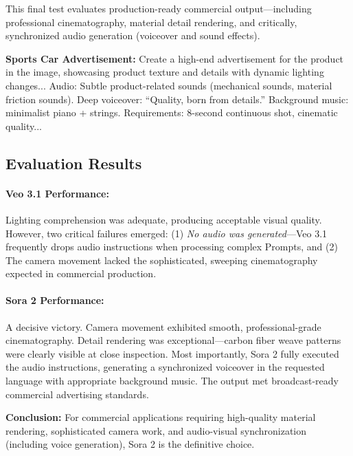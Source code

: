 This final test evaluates production-ready commercial output---including professional cinematography, material detail rendering, and critically, synchronized audio generation (voiceover and sound effects).

\begin{promptbox}
\small
\textbf{Sports Car Advertisement:} Create a high-end advertisement for the product in the image, showcasing product texture and details with dynamic lighting changes... Audio: Subtle product-related sounds (mechanical sounds, material friction sounds). Deep voiceover: ``Quality, born from details.'' Background music: minimalist piano + strings. Requirements: 8-second continuous shot, cinematic quality...
\end{promptbox}

\subsection{Evaluation Results}

\paragraph{Veo 3.1 Performance:}
Lighting comprehension was adequate, producing acceptable visual quality. However, two critical failures emerged: (1) \textit{No audio was generated}---Veo 3.1 frequently drops audio instructions when processing complex Prompts, and (2) The camera movement lacked the sophisticated, sweeping cinematography expected in commercial production.

\paragraph{Sora 2 Performance:}
A decisive victory. Camera movement exhibited smooth, professional-grade cinematography. Detail rendering was exceptional---carbon fiber weave patterns were clearly visible at close inspection. Most importantly, Sora 2 fully executed the audio instructions, generating a synchronized voiceover in the requested language with appropriate background music. The output met broadcast-ready commercial advertising standards.

\begin{resultbox}
\textbf{Conclusion:} For commercial applications requiring high-quality material rendering, sophisticated camera work, and audio-visual synchronization (including voice generation), Sora 2 is the definitive choice.
\end{resultbox}

